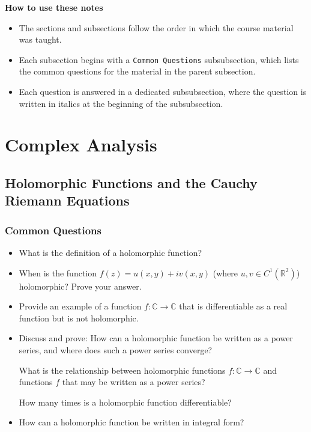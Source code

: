 \documentclass[11pt, a4paper]{article}
\newcommand{\R}{\mathbb{R}} %
\newcommand{\C}{\mathbb{C}} %
\begin{document}
\vspace{5mm}
\textbf{How to use these notes}
\begin{itemize}
    \item The sections and subsections follow the order in which the course material was taught.

    \item Each subsection begins with a \texttt{Common Questions} subsubsection, which lists the common questions for the material in the parent subsection.

    \item  Each question is answered in a dedicated subsubsection, where the question is written in italics at the beginning of the subsubsection.
\end{itemize}


\newpage

\tableofcontents

\newpage
\pagestyle{headerstyle}
\section{Complex Analysis}

\subsection{Holomorphic Functions and the Cauchy Riemann Equations}

\subsubsection{Common Questions}
\begin{itemize}
	\item What is the definition of a holomorphic function?
	
	\item When is the function $ f(z) = u(x, y) + iv(x, y) $ (where $ u, v \in C^{1}(\R^2)$) holomorphic? Prove your answer. 
	
	\item Provide an example of a function $ f: \C \to \C $ that is differentiable as a real function but is not holomorphic.
	
	\item Discuss and prove: How can a holomorphic function be written as a power series, and where does such a power series converge?
	
	What is the relationship between holomorphic functions $ f:\C \to \C $ and functions $ f $ that may be written as a power series?
	
	How many times is a holomorphic function differentiable? 
	
	 \item How can a holomorphic function be written in integral form? 

\end{itemize}
\end{document}
